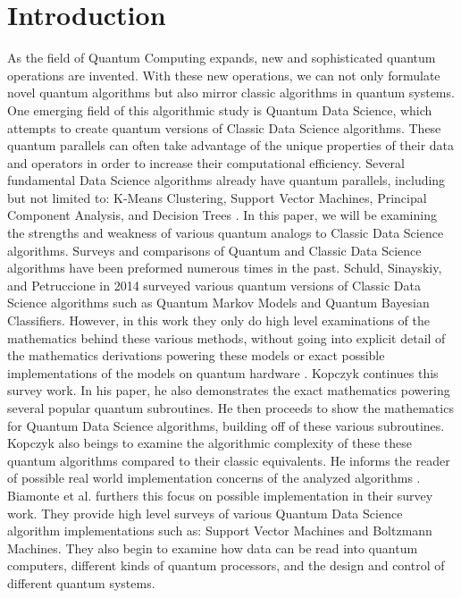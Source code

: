 \documentclass[conference]{IEEEtran}
\begin{document}
\section{Introduction}
As the field of Quantum Computing expands, new and sophisticated quantum operations are invented. With these new operations, we can not only formulate novel quantum algorithms but also mirror classic algorithms in quantum systems. One emerging field of this algorithmic study is Quantum Data Science, which attempts to create quantum versions of Classic Data Science algorithms. These quantum parallels can often take advantage of the unique properties of their data and operators in order to increase their computational efficiency. Several fundamental Data Science algorithms already have quantum parallels, including but not limited to: K-Means Clustering, Support Vector Machines, Principal Component Analysis, and Decision Trees \cite{b1} \cite{b2} \cite{b3} \cite{b4}. 
\newline
\indent In this paper, we will be examining the strengths and weakness of various quantum analogs to Classic Data Science algorithms. Surveys and comparisons of Quantum and Classic Data Science algorithms have been preformed numerous times in the past. Schuld, Sinayskiy, and Petruccione in 2014 surveyed various quantum versions of Classic Data Science algorithms such as Quantum Markov Models and Quantum Bayesian Classifiers. However, in this work they only do high level examinations of the mathematics behind these various methods, without going into explicit detail of the mathematics derivations powering these models or exact possible implementations of the models on quantum hardware \cite{b5}.
\newline
\indent Kopczyk continues this survey work. In his paper, he also demonstrates the exact mathematics powering several popular quantum subroutines. He then proceeds to show the mathematics for Quantum Data Science algorithms, building off of these various subroutines. Kopczyk also beings to examine the algorithmic complexity of these these quantum algorithms compared to their classic equivalents. He informs the reader of possible real world implementation concerns of the analyzed algorithms \cite{b6}. 
\newline
\indent Biamonte et al. furthers this focus on possible implementation in their survey work. They provide high level surveys of various Quantum Data Science algorithm implementations such as: Support Vector Machines and Boltzmann Machines. They also begin to examine how data can be read into quantum computers, different kinds of quantum processors, and the design and control of different quantum systems.\cite{b7}
\end{document}
